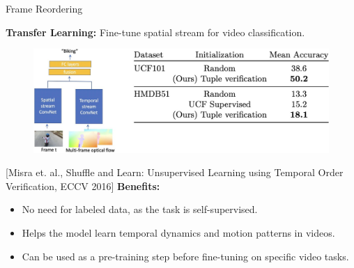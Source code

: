 \begin{frame}[allowframebreaks]{Frame Reordering}
\begin{figure}
    \end{figure}
\framebreak
    \textbf{Transfer Learning:} Fine-tune spatial stream for video classification.
    \begin{figure}
        \centering
        \includegraphics[width=1.07\textwidth,height=0.8\textheight,keepaspectratio]{images/video/slide_46_1_img.jpg}
    \end{figure}
    \footnotesize{[Misra et. al., Shuffle and Learn: Unsupervised Learning using Temporal Order Verification, ECCV 2016]}
\framebreak
    \textbf{Benefits:}
    \begin{itemize}
        \item No need for labeled data, as the task is self-supervised.
        \item Helps the model learn temporal dynamics and motion patterns in videos.
        \item Can be used as a pre-training step before fine-tuning on specific video tasks.
    \end{itemize}
\end{frame}